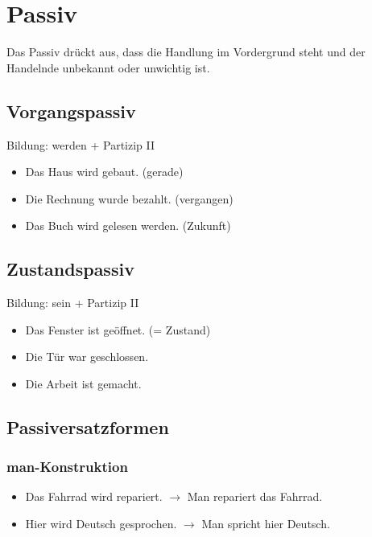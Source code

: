 \chapter{Passiv}
\label{cha:Passiv}

Das Passiv drückt aus, dass die Handlung im Vordergrund steht und der Handelnde unbekannt oder unwichtig ist.

\section{Vorgangspassiv}
\label{sec:Vorgangspassiv}

Bildung: werden + Partizip II

\begin{itemize}
    \item Das Haus wird gebaut. (gerade)
    \item Die Rechnung wurde bezahlt. (vergangen)
    \item Das Buch wird gelesen werden. (Zukunft)
\end{itemize}

\section{Zustandspassiv}
\label{sec:Zustandspassiv}

Bildung: sein + Partizip II

\begin{itemize}
    \item Das Fenster ist geöffnet. (= Zustand)
    \item Die Tür war geschlossen.
    \item Die Arbeit ist gemacht.
\end{itemize}

\section{Passiversatzformen}
\label{sec:Passiversatz}

\subsection{man-Konstruktion}
\begin{itemize}
    \item Das Fahrrad wird repariert. $\rightarrow$ Man repariert das Fahrrad.
    \item Hier wird Deutsch gesprochen. $\rightarrow$ Man spricht hier Deutsch.
\end{itemize}

